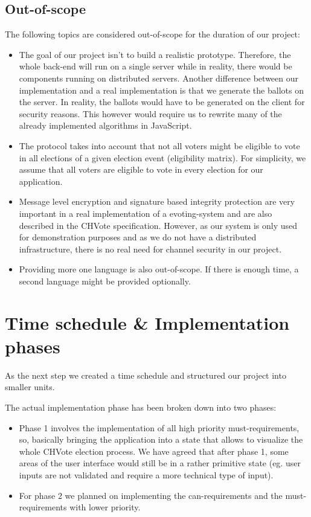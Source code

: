 \subsection{Out-of-scope}
The following topics are considered out-of-scope for the duration of our project:
\begin{itemize}
	\item The goal of our project isn't to build a realistic prototype. Therefore, the whole back-end will run on a single server while in reality, there would be components running on distributed servers. Another difference between our implementation and a real implementation is that we generate the ballots on the server. In reality, the ballots would have to be generated on the client for security reasons. This however would require us to rewrite many of the already implemented algorithms in JavaScript.
	\item The protocol takes into account that not all voters might be eligible to vote in all elections of a given election event (eligibility matrix). For simplicity, we assume that all voters are eligible to vote in every election for our application.
	\item Message level encryption and signature based integrity protection are very important in a real implementation of a evoting-system and are also described in the CHVote specification. However, as our system is only used for demonstration purposes and as we do not have a distributed infrastructure, there is no real need for channel security in our project.	
	\item Providing more one language is also out-of-scope. If there is enough time, a second language might be provided optionally.
\end{itemize}

\section{Time schedule \& Implementation phases}
As the next step we created a time schedule and structured our project into smaller units.

The actual implementation phase has been broken down into two phases: 

\begin{itemize}
	\item Phase 1 involves the implementation of all high priority must-requirements, so, basically bringing the application into a state that allows to visualize the whole CHVote election process. We have agreed that after phase 1, some areas of the user interface would still be in a rather primitive state (eg. user inputs are not validated and require a more technical type of input). 
	\item For phase 2 we planned on implementing the can-requirements and the must-requirements with lower priority.
\end{itemize}

